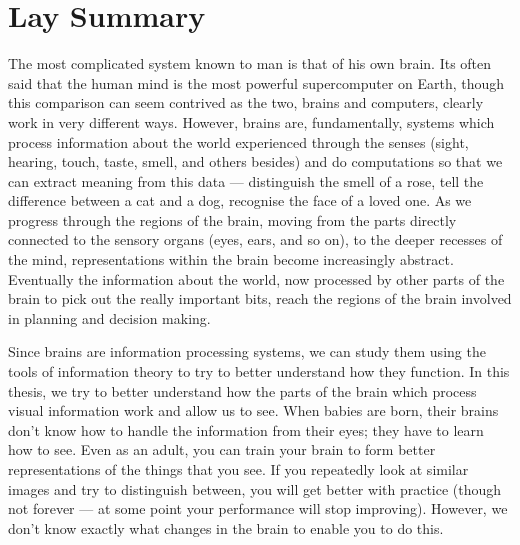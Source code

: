 

\begingroup

\let\clearpage\relax
\let\cleardoublepage\relax
\let\cleardoublepage\relax

\chapter*{Lay Summary}

The most complicated system known to man is that of his own brain.
Its often said that the human mind is the most powerful supercomputer on Earth, though this comparison can seem contrived as the two, brains and computers, clearly work in very different ways.
However, brains are, fundamentally, systems which process information about the world experienced through the senses (sight, hearing, touch, taste, smell, and others besides) and do computations so that we can extract meaning from this data --- distinguish the smell of a rose, tell the difference between a cat and a dog, recognise the face of a loved one.
As we progress through the regions of the brain, moving from the parts directly connected to the sensory organs (eyes, ears, and so on), to the deeper recesses of the mind, representations within the brain become increasingly abstract.
Eventually the information about the world, now processed by other parts of the brain to pick out the really important bits, reach the regions of the brain involved in planning and decision making.


Since brains are information processing systems, we can study them using the tools of information theory to try to better understand how they function.
In this thesis, we try to better understand how the parts of the brain which process visual information work and allow us to see.
When babies are born, their brains don't know how to handle the information from their eyes; they have to learn how to see.
Even as an adult, you can train your brain to form better representations of the things that you see.
If you repeatedly look at similar images and try to distinguish between, you will get better with practice (though not forever --- at some point your performance will stop improving).
However, we don't know exactly what changes in the brain to enable you to do this.

